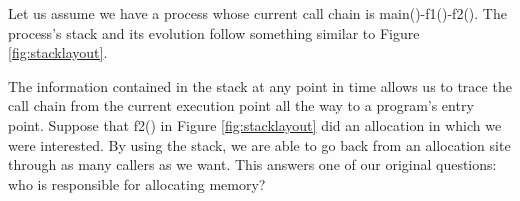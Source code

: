 Let us assume we have a process whose current call chain is main()-f1()-f2(). The process's stack and its evolution follow something similar to Figure \ref{fig:stacklayout}.

The information contained in the stack at any point in time allows us to trace the call chain from the current execution point all the way to a program's entry point. Suppose that f2() in Figure \ref{fig:stacklayout} did an allocation in which we were interested. By using the stack, we are able to go back from an allocation site through as many callers as we want. This answers one of our original questions: who is responsible for allocating memory?
